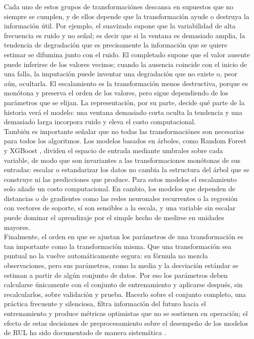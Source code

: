 Cada uno de estos grupos de transformaciónes descansa en supuestos que no siempre se cumplen, y de ellos depende que la transformación ayude o destruya la información útil. Por ejemplo, el suavizado supone que la variabilidad de alta frecuencia es ruido y no señal; es decir que si la ventana es demasiado amplia, la tendencia de degradación que es precisamente la información que se quiere estimar se difumina junto con el ruido. El completado supone que el valor ausente puede inferirse de los valores vecinos; cuando la ausencia coincide con el inicio de una falla, la imputación puede inventar una degradación que no existe o, peor aún, ocultarla. El escalamiento es la transformación menos destructiva, porque es monótona y preserva el orden de los valores, pero sigue dependiendo de los parámetros que se elijan. La representación, por su parte, decide qué parte de la historia verá el modelo: una ventana demasiado corta oculta la tendencia y una demasiado larga incorpora ruido y eleva el costo computacional.\\[.15cm]

También es importante señalar que no todas las transformaciónes son necesarias para todos los algoritmos. Los modelos basados en árboles, como Random Forest \cite{breiman2001} y XGBoost \cite{chen2016}, dividen el espacio de entrada mediante umbrales sobre cada variable, de modo que son invariantes a las transformaciones monótonas de sus entradas: escalar o estandarizar los datos no cambia la estructura del árbol que se construye ni las predicciones que produce. Para estos modelos el escalamiento solo añade un costo computacional. En cambio, los modelos que dependen de distancias o de gradientes como las redes neuronales recurrentes o la regresión con vectores de soporte, sí son sensibles a la escala, y una variable sin escalar puede dominar el aprendizaje por el simple hecho de medirse en unidades mayores.\\[.15cm]

Finalmente, el orden en que se ajustan los parámetros de una transformación es tan importante como la transformación misma. Que una transformación sea puntual no la vuelve automáticamente segura: su fórmula no mezcla observaciones, pero sus parámetros, como la media y la desviación estándar se estiman a partir de algún conjunto de datos. Por eso los parámetros deben calcularse únicamente con el conjunto de entrenamiento y aplicarse después, sin recalcularlos, sobre validación y prueba. Hacerlo sobre el conjunto completo, una práctica frecuente y silenciosa, filtra información del futuro hacia el entrenamiento y produce métricas optimistas que no se sostienen en operación; el efecto de estas decisiones de preprocesamiento sobre el desempeño de los modelos de RUL ha sido documentado de manera sistemática \cite{ruvaifa2026}.\\[.15cm]

